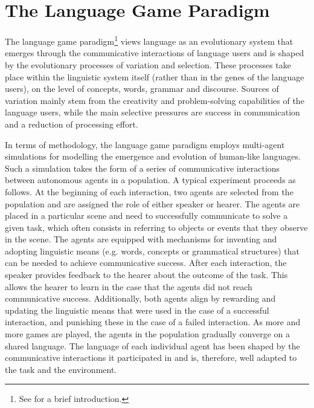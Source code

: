 \documentclass[a4paper,abstract]{scrartcl}
\begin{document}
\section{The Language Game Paradigm}

The language game paradigm\footnote{See \cite{steels2012self} for a brief introduction.} views language as an evolutionary system that emerges through the communicative interactions of language users and is shaped by the evolutionary processes of variation and selection. These processes take place within the linguistic system itself (rather than in the genes of the language users), on the level of concepts, words, grammar and discourse. Sources of variation mainly stem from the creativity and problem-solving capabilities of the language users, while the main selective pressures are success in communication and a reduction of processing effort. 

In terms of methodology, the language game paradigm employs multi-agent simulations for modelling the emergence and evolution of human-like languages. Such a simulation takes the form of a series of communicative interactions between autonomous agents in a population. A typical experiment proceeds as follows. At the beginning of each interaction, two agents are selected from the population and are assigned the role of either speaker or hearer. The agents are placed in a particular scene and need to successfully communicate to solve a given task, which often consists in referring to objects or events that they observe in the scene. The agents are equipped with mechanisms for inventing and adopting linguistic means (e.g. words, concepts or grammatical structures) that can be needed to achieve communicative success. After each interaction, the speaker provides feedback to the hearer about the outcome of the task. This allows the hearer to learn in the case that the agents did not reach communicative success. Additionally, both agents align by rewarding and updating the linguistic means that were used in the case of a successful interaction, and punishing these in the case of a failed interaction. As more and more games are played, the agents in the population gradually converge on a shared language. The language of each individual agent has been shaped by the communicative interactions it participated in and is, therefore, well adapted to the task and the environment.
\end{document}
